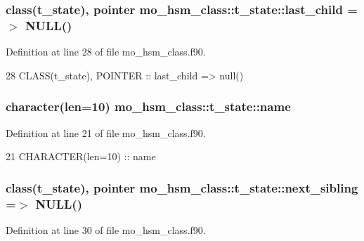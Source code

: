 \subsubsection[{last\+\_\+child}]{\setlength{\rightskip}{0pt plus 5cm}class({\bf t\+\_\+state}), pointer mo\+\_\+hsm\+\_\+class\+::t\+\_\+state\+::last\+\_\+child =$>$ N\+U\+L\+L()}\label{structmo__hsm__class_1_1t__state_a70f8607c4cc9e25636b875f34ce0a4b4}


Definition at line 28 of file mo\+\_\+hsm\+\_\+class.\+f90.


\begin{DoxyCode}
28     \textcolor{keywordtype}{CLASS}(t\_state), \textcolor{keywordtype}{POINTER}     :: last\_child   => null()
\end{DoxyCode}
\hypertarget{structmo__hsm__class_1_1t__state_ac8d63780002fd7fa1935c398be583cec}{}
\subsubsection[{name}]{\setlength{\rightskip}{0pt plus 5cm}character(len=10) mo\+\_\+hsm\+\_\+class\+::t\+\_\+state\+::name}\label{structmo__hsm__class_1_1t__state_ac8d63780002fd7fa1935c398be583cec}


Definition at line 21 of file mo\+\_\+hsm\+\_\+class.\+f90.


\begin{DoxyCode}
21     \textcolor{keywordtype}{CHARACTER(len=10)}           :: name
\end{DoxyCode}
\hypertarget{structmo__hsm__class_1_1t__state_a61cd4f70194c69639c03f7454a86c712}{}
\subsubsection[{next\+\_\+sibling}]{\setlength{\rightskip}{0pt plus 5cm}class({\bf t\+\_\+state}), pointer mo\+\_\+hsm\+\_\+class\+::t\+\_\+state\+::next\+\_\+sibling =$>$ N\+U\+L\+L()}\label{structmo__hsm__class_1_1t__state_a61cd4f70194c69639c03f7454a86c712}


Definition at line 30 of file mo\+\_\+hsm\+\_\+class.\+f90.


